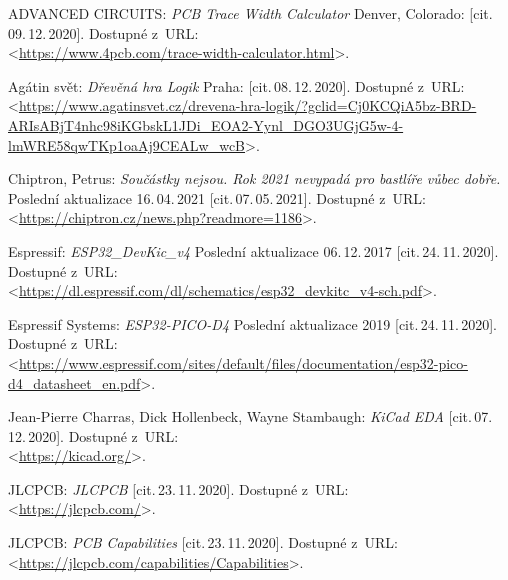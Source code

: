

\begin{thebibliography}{99}
    ADVANCED CIRCUITS:
    \emph{PCB Trace Width Calculator}
    Denver, Colorado: [cit.\,09.\,12.\,2020].
    Dostupné z~URL:\\
    <\url{https://www.4pcb.com/trace-width-calculator.html}>.

    Agátin svět:
    \emph{Dřevěná hra Logik}
    Praha: [cit.\,08.\,12.\,2020].
    Dostupné z~URL:\\
    <\url{https://www.agatinsvet.cz/drevena-hra-logik/?gclid=Cj0KCQiA5bz-BRD-ARIsABjT4nhc98iKGbskL1JDi_EOA2-Yynl_DGO3UGjG5w-4-lmWRE58qwTKp1oaAj9CEALw_wcB}>.

    Chiptron, Petrus:
    \emph{Součástky nejsou. Rok 2021 nevypadá pro bastlíře vůbec dobře.}
    Poslední aktualizace 16.\,04.\,2021 [cit.\,07.\,05.\,2021].
    Dostupné z~URL:\\
    <\url{https://chiptron.cz/news.php?readmore=1186}>.

    Espressif:
    \emph{ESP32\_DevKic\_v4}
    Poslední aktualizace 06.\,12.\,2017 [cit.\,24.\,11.\,2020].
    Dostupné z~URL:\\
    <\url{https://dl.espressif.com/dl/schematics/esp32_devkitc_v4-sch.pdf}>.

    Espressif Systems:
    \emph{ESP32-PICO-D4}
    Poslední aktualizace 2019 [cit.\,24.\,11.\,2020].
    Dostupné z~URL:\\
    <\url{https://www.espressif.com/sites/default/files/documentation/esp32-pico-d4_datasheet_en.pdf}>.

    Jean-Pierre Charras, Dick Hollenbeck, Wayne Stambaugh:
    \emph{KiCad EDA}
    [cit.\,07.\,12.\,2020].
    Dostupné z~URL:\\
    <\url{https://kicad.org/}>.

    JLCPCB:
    \emph{JLCPCB}
    [cit.\,23.\,11.\,2020].
    Dostupné z~URL:\\
    <\url{https://jlcpcb.com/}>.

    JLCPCB:
    \emph{PCB Capabilities}
    [cit.\,23.\,11.\,2020].
    Dostupné z~URL:\\
    <\url{https://jlcpcb.com/capabilities/Capabilities}>.


\end{thebibliography}
